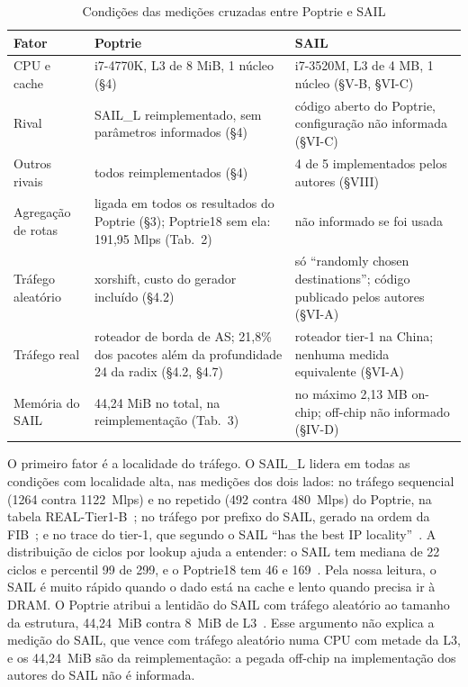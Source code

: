 \documentclass[conference,a4paper]{IEEEtran}
\begin{document}
\begin{table}[t]
\centering
\caption{Condições das medições cruzadas entre Poptrie e SAIL}
\label{tab:fatores}
\footnotesize
\begin{tabular}{P{1.3cm} P{3.1cm} P{3.1cm}}
\toprule
Fator & Poptrie~\cite{asai15} & SAIL~\cite{yang18} \\
\midrule
CPU e cache & i7-4770K, L3 de 8 MiB, 1 núcleo (\S4) & i7-3520M, L3 de 4 MB, 1 núcleo (\S V-B, \S VI-C) \\
\addlinespace
Rival & SAIL\_L reimplementado, sem parâmetros informados (\S4) & código aberto do Poptrie, configuração não informada (\S VI-C) \\
\addlinespace
Outros rivais & todos reimplementados (\S4) & 4 de 5 implementados pelos autores (\S VIII) \\
\addlinespace
Agregação de rotas & ligada em todos os resultados do Poptrie (\S3); Poptrie18 sem ela: 191,95 Mlps (Tab.~2) & não informado se foi usada \\
\addlinespace
Tráfego aleatório & xorshift, custo do gerador incluído (\S4.2) & só ``randomly chosen destinations''; código publicado pelos autores (\S VI-A) \\
\addlinespace
Tráfego real & roteador de borda de AS; 21,8\% dos pacotes além da profundidade 24 da radix (\S4.2, \S4.7) & roteador tier-1 na China; nenhuma medida equivalente (\S VI-A) \\
\addlinespace
Memória do SAIL & 44,24 MiB no total, na reimplementação (Tab.~3) & no máximo 2,13 MB on-chip; off-chip não informado (\S IV-D) \\
\bottomrule
\end{tabular}
\end{table}

O primeiro fator é a localidade do tráfego. O SAIL\_L lidera em todas as condições com localidade alta, nas medições dos
dois lados: no tráfego sequencial (1264 contra 1122~Mlps) e no repetido (492 contra 480~Mlps) do Poptrie, na tabela
REAL-Tier1-B~\cite[\S4.5]{asai15}; no tráfego por prefixo do SAIL, gerado na ordem da FIB~\cite[\S VI-A]{yang18}; e no trace do
tier-1, que segundo o SAIL ``has the best IP locality''~\cite[\S VI-C]{yang18}. A distribuição de ciclos por lookup
ajuda a entender: o SAIL tem mediana de 22 ciclos e percentil 99 de 299, e o Poptrie18 tem 46 e 169~\cite[Tab.~4]{asai15}.
Pela nossa leitura, o SAIL é muito rápido quando o dado está na cache e lento quando precisa ir à DRAM. O Poptrie atribui
a lentidão do SAIL com tráfego aleatório ao tamanho da estrutura, 44,24~MiB contra 8~MiB de L3~\cite[\S4.5,
\S4.6]{asai15}. Esse argumento não explica a medição do SAIL, que vence com tráfego aleatório numa CPU com metade da L3, e
os 44,24~MiB são da reimplementação: a pegada off-chip na implementação dos autores do SAIL não é informada.
\end{document}
